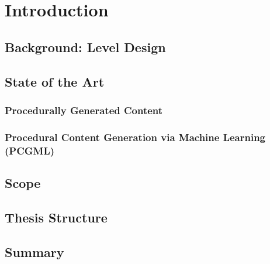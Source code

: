 \chapter{Introduction}

\section{Background: Level Design}
\section{State of the Art}
\subsection{Procedurally Generated Content}
\subsection{Procedural Content Generation via Machine Learning (PCGML)}
\section{Scope}
\section{Thesis Structure}
\section{Summary}